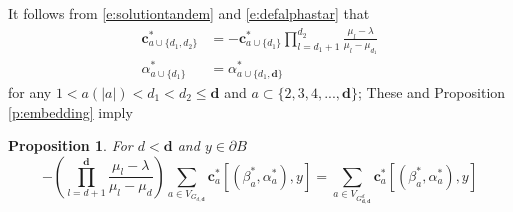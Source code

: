 \documentclass[11pt,a4paper]{article}
\newtheorem{proposition}{Proposition}[section]
\begin{document}
It follows from \eqref{e:solutiontandem} 
and \eqref{e:defalphastar} that
\begin{align*}
{\boldsymbol c}^*_{a \cup \{d_1,d_2\}} &=-{\boldsymbol c}^*_{a \cup \{d_1\}} 
\prod_{l=d_1+1}^{d_2} \frac{ \mu_l - \lambda}{\mu_l - \mu_{d_1}}
\\
\alpha^*_{a \cup \{d_1\}} &= \alpha^*_{a \cup \{d_1,{\boldsymbol d}\}}
\end{align*}
for any 
$1 < a(|a|) < d_1 < d_2 \le {\bm d}$ and 
$a \subset \{2,3,4,...,{\bm d}\}$;
These and Proposition \ref{p:embedding} imply
\begin{proposition}
For $d < {\boldsymbol d}$ and $y \in \partial B$
\begin{equation}\label{e:embeddingfunc}
-\left(\prod_{l=d+1}^{{\boldsymbol d}} \frac{ \mu_l - \lambda}{\mu_l - \mu_d}\right)
\sum_{ a \in V_{G_{d,{\bm d}} }} {\boldsymbol c}_a^* [ (\beta_a^*, \alpha_a^*), y ]
=
\sum_{ a \in V_{G_{{\bm d},{\boldsymbol d}}^d }} {\boldsymbol c}_a^* [ (\beta_a^*, \alpha_a^*), y ]
\end{equation}
\end{proposition}
\end{document}
